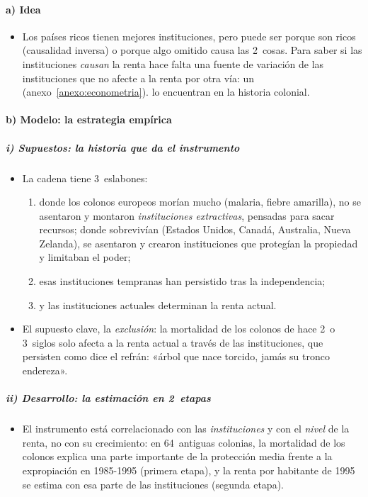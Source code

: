 \documentclass[11pt]{article}
\begin{document}
\paragraph{a) Idea}

\begin{itemize}
\item Los países ricos tienen mejores instituciones, pero puede ser porque son ricos (causalidad inversa) o porque algo omitido causa las 2~cosas. Para saber si las instituciones \emph{causan} la renta hace falta una fuente de variación de las instituciones que no afecte a la renta por otra vía: un  (anexo~\ref{anexo:econometria}). \textcite{AcemogluJohnsonRobinson2001Colonial} lo encuentran en la historia colonial.
\end{itemize}

\paragraph{b) Modelo: la estrategia empírica}

\subparagraph{i) Supuestos: la historia que da el instrumento}

\begin{itemize}
\item La cadena tiene 3~eslabones:
  \begin{enumerate}
  \item donde los colonos europeos morían mucho (malaria, fiebre amarilla), no se asentaron y montaron \emph{instituciones extractivas}, pensadas para sacar recursos; donde sobrevivían (Estados Unidos, Canadá, Australia, Nueva Zelanda), se asentaron y crearon instituciones que protegían la propiedad y limitaban el poder;
  \item esas instituciones tempranas han persistido tras la independencia;
  \item y las instituciones actuales determinan la renta actual.
  \end{enumerate}
\item El supuesto clave, la \emph{exclusión}: la mortalidad de los colonos de hace 2~o 3~siglos solo afecta a la renta actual a través de las instituciones, que persisten como dice el refrán: «árbol que nace torcido, jamás su tronco endereza».
\end{itemize}

\subparagraph{ii) Desarrollo: la estimación en 2~etapas}

\begin{itemize}
\item El instrumento está correlacionado con las \emph{instituciones} y con el \emph{nivel} de la renta, no con su crecimiento: en 64~antiguas colonias, la mortalidad de los colonos explica una parte importante de la protección media frente a la expropiación en 1985-1995 (primera etapa), y la renta por habitante de 1995 se estima con esa parte de las instituciones (segunda etapa).
\end{itemize}
\end{document}

